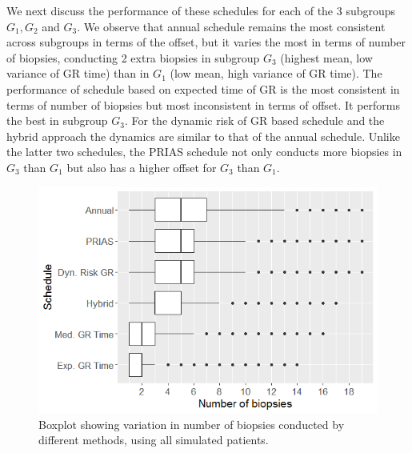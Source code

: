 We next discuss the performance of these schedules for each of the 3 subgroups $G_1, G_2$ and $G_3$. We observe that annual schedule remains the most consistent across subgroups in terms of the offset, but it varies the most in terms of number of biopsies, conducting 2 extra biopsies in subgroup $G_3$ (highest mean, low variance of GR time) than in $G_1$ (low mean, high variance of GR time). The performance of schedule based on expected time of GR is the most consistent in terms of number of biopsies but most inconsistent in terms of offset. It performs the best in subgroup $G_3$. For the dynamic risk of GR based schedule and the hybrid approach the dynamics are similar to that of the annual schedule. Unlike the latter two schedules, the PRIAS schedule not only conducts more biopsies in $G_3$ than $G_1$ but also has a higher offset for $G_3$ than $G_1$.

\begin{figure}[!htb]
\centerline{\includegraphics[width=\columnwidth]{images/sim_study/nbBoxPlot_all.png}}
\caption{Boxplot showing variation in number of biopsies conducted by different methods, using all simulated patients.}
\label{fig : nbBoxPlot_all}
\end{figure}

